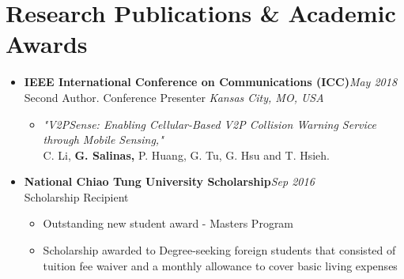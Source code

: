 \section{\sectionheading Research Publications \& Academic Awards}

\begin{itemize}[leftmargin=0pt, label={}]%

\item{
{\sectionheading\large{\textbf{IEEE International Conference on Communications (ICC)}}}\hfill {\sectionheading\small{\textit{May 2018}}}\\
{\sectionheading\small{Second Author. Conference Presenter}}\hfill
{\sectionheading\small{\textit{Kansas City, MO, USA}}}

    \vspace{-6pt}
    \begin{itemize}[label=\textbullet, leftmargin=*, noitemsep]
        \item{
        \textit{"V2PSense: Enabling Cellular-Based V2P Collision Warning Service through Mobile Sensing,"}\\
        C. Li, \textbf{G. Salinas,} P. Huang, G. Tu, G. Hsu and T. Hsieh.
        }
    \end{itemize}
}

\item{
{\sectionheading\large{\textbf{National Chiao Tung University Scholarship}}}\hfill {\sectionheading\small{\textit{Sep 2016}}}\\
{\sectionheading\small{Scholarship Recipient}}\hfill

    \vspace{-6pt}
    \begin{itemize}[label=\textbullet, leftmargin=*, noitemsep]%
        \item{Outstanding new student award - Masters Program}
        \item{Scholarship awarded to Degree-seeking foreign students that consisted of tuition fee waiver and a monthly allowance to cover basic living expenses}
    \end{itemize}
}


\end{itemize}
